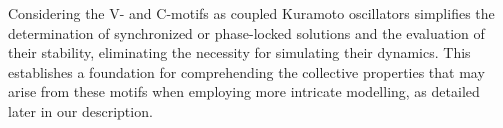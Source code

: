 \documentclass[../main.tex]{subfiles}
\begin{document}
Considering the V- and C-motifs as coupled Kuramoto oscillators simplifies the determination of synchronized or phase-locked solutions and the evaluation of their stability, eliminating the necessity for simulating their dynamics. 
This establishes a foundation for comprehending the collective properties that may arise from these motifs when employing more intricate modelling, as detailed later in our description.
\end{document}
